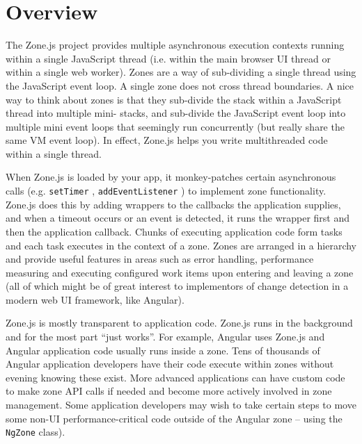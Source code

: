 \section{Overview}

The Zone.js project provides multiple asynchronous execution contexts running within
a single JavaScript thread (i.e. within the main browser UI thread or within a single
web worker). Zones are a way of sub-dividing a single thread using the JavaScript
event loop. A single zone does not cross thread boundaries. A nice way to think about
zones is that they sub-divide the stack within a JavaScript thread into multiple mini-
stacks, and sub-divide the JavaScript event loop into multiple mini event loops that
seemingly run concurrently (but really share the same VM event loop). In effect,
Zone.js helps you write multithreaded code within a single thread.

When Zone.js is loaded by your app, it monkey-patches certain asynchronous calls
(e.g.
\texttt{setTimer}
,
\texttt{addEventListener}
) to implement zone functionality. Zone.js does
this by adding wrappers to the callbacks the application supplies, and when a timeout
occurs or an event is detected, it runs the wrapper first and then the application
callback. Chunks of executing application code form tasks and each task executes in
the context of a zone. Zones are arranged in a hierarchy and provide useful features
in areas such as error handling, performance measuring and executing configured
work items upon entering and leaving a zone (all of which might be of great interest
to implementors of change detection in a modern web UI framework, like Angular).

Zone.js is mostly transparent to application code. Zone.js runs in the background and
for the most part “just works”. For example, Angular uses Zone.js and Angular
application code usually runs inside a zone. Tens of thousands of Angular application
developers have their code execute within zones without evening knowing these exist.
More advanced applications can have custom code to make zone API calls if needed
and become more actively involved in zone management. Some application
developers may wish to take certain steps to move some non-UI performance-critical
code outside of the Angular zone – using the
\texttt{NgZone}
class).




